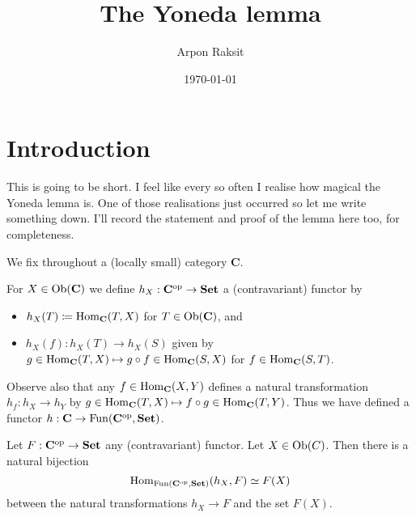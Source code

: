 


\title{The Yoneda lemma}
\author{Arpon Raksit}
\date{\today}


\maketitle
\thispagestyle{fancy}


\renewcommand{\C}{\mathbf{C}}
\renewcommand{\D}{\mathsf{D}}

\section{Introduction}

This is going to be short. I feel like every so often I realise how
magical the Yoneda lemma is. One of those realisations just occurred
so let me write something down. I'll record the statement and proof of
the lemma here too, for completeness.

\begin{notation}
  We fix throughout a (locally small) category $\C$.
\end{notation}

\begin{definition}
  For $X \in \Ob(\C)$ we define $h_X : \C^\op \to \Set$ a
  (contravariant) functor by
  \begin{itemize}
  \item $h_X(T) \coloneqq \Hom_\C(T,X)$ for $T \in \Ob(\C)$, and
  \item $h_X(f) : h_X(T) \to h_X(S)$ given by $g \in \Hom_\C(T,X)
    \mapsto g \circ f \in \Hom_\C(S,X)$ for $f \in \Hom_\C(S,T)$.
  \end{itemize}
  Observe also that any $f \in \Hom_\C(X,Y)$ defines a natural
  transformation $h_f : h_X \to h_Y$ by $g \in \Hom_\C(T,X) \mapsto f
  \circ g \in \Hom_\C(T,Y)$. Thus we have defined a functor $h : \C
  \to \Fun(\C^\op, \Set)$.
\end{definition}

\begin{lemma}[Yoneda]
  Let $F : \C^\op \to \Set$ any (contravariant) functor. Let $X \in
  \operatorname{Ob}(C)$. Then there is a natural bijection
  \[
  \Hom_{\Fun(\C^\op,\Set)}(h_X,F) \simeq F(X)
  \]
  between the natural transformations $h_X \to F$ and the set $F(X)$.
\end{lemma}

